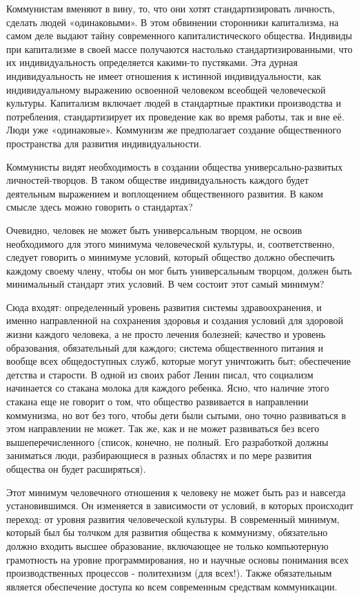 \documentclass[../main]{subfiles}
\begin{document}
Коммунистам вменяют в вину, то, что они хотят стандартизировать личность, сделать людей «одинаковыми». В этом обвинении сторонники капитализма, на самом деле выдают тайну современного капиталистического общества. Индивиды при капитализме в своей массе получаются настолько стандартизированными, что их индивидуальность определяется какими-то пустяками. Эта дурная индивидуальность не имеет отношения к истинной индивидуальности, как индивидуальному выражению освоенной человеком всеобщей человеческой культуры. Капитализм включает людей в стандартные практики производства и потребления, стандартизирует их проведение как во время работы, так и вне её. Люди уже «одинаковые». Коммунизм же предполагает создание общественного пространства для развития индивидуальности.

Коммунисты видят необходимость в создании общества универсально-развитых личностей-творцов. В таком обществе индивидуальность каждого будет деятельным выражением и воплощением общественного развития. В каком смысле здесь можно говорить о стандартах?

Очевидно, человек не может быть универсальным творцом, не освоив необходимого для этого минимума человеческой культуры, и, соответственно, следует говорить о минимуме условий, который общество должно обеспечить каждому своему члену, чтобы он мог быть универсальным творцом, должен быть минимальный стандарт этих условий. В чем состоит этот самый минимум?

Сюда входят: определенный уровень развития системы здравоохранения, и именно направленной на сохранения здоровья и создания условий для здоровой жизни каждого человека, а не просто лечения болезней; качество и уровень образования, обязательный для каждого; система общественного питания и вообще всех общедоступных служб, которые могут уничтожить быт; обеспечение детства и старости. В одной из своих работ Ленин писал, что социализм начинается со стакана молока для каждого ребенка. Ясно, что наличие этого стакана еще не говорит о том, что общество развивается в направлении коммунизма, но вот без того, чтобы дети были сытыми, оно точно развиваться в этом направлении не может. Так же, как и не может развиваться без всего вышеперечисленного (список, конечно, не полный. Его разработкой должны заниматься люди, разбирающиеся в разных областях и по мере развития общества он будет расширяться).

Этот минимум человечного отношения к человеку не может быть раз и навсегда установившимся. Он изменяется в зависимости от условий, в которых происходит переход: от уровня развития человеческой культуры. В современный минимум, который был бы толчком для развития общества к коммунизму, обязательно должно входить высшее образование, включающее не только компьютерную грамотность на уровне программирования, но и научные основы понимания всех производственных процессов - политехнизм (для всех!). Также обязательным является обеспечение доступа ко всем современным средствам коммуникации.
\end{document}
